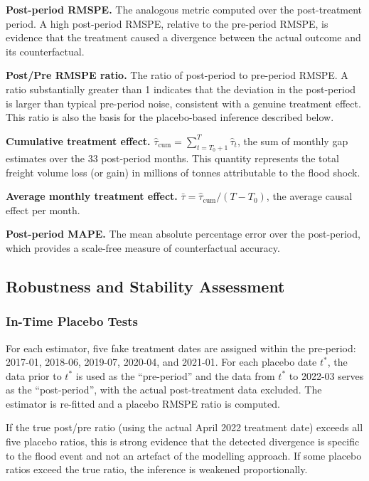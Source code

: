 \textbf{Post-period RMSPE.}
The analogous metric computed over the post-treatment period.
A high post-period RMSPE, relative to the pre-period RMSPE, is
evidence that the treatment caused a divergence between the actual
outcome and its counterfactual.

\textbf{Post/Pre RMSPE ratio.}
The ratio of post-period to pre-period RMSPE.
A ratio substantially greater than 1 indicates that the deviation
in the post-period is larger than typical pre-period noise,
consistent with a genuine treatment effect.
This ratio is also the basis for the placebo-based inference described
below.

\textbf{Cumulative treatment effect.}
$\hat{\tau}_{\text{cum}} = \sum_{t=T_0+1}^{T} \hat{\tau}_t$, the
sum of monthly gap estimates over the 33 post-period months.
This quantity represents the total freight volume loss (or gain) in
millions of tonnes attributable to the flood shock.

\textbf{Average monthly treatment effect.}
$\bar{\tau} = \hat{\tau}_{\text{cum}} / (T - T_0)$, the average
causal effect per month.

\textbf{Post-period MAPE.}
The mean absolute percentage error over the post-period, which
provides a scale-free measure of counterfactual accuracy.

\subsection{Robustness and Stability Assessment}
\label{sec:robustness}

\subsubsection{In-Time Placebo Tests}
\label{sec:placebo}

For each estimator, five fake treatment dates are assigned within
the pre-period: 2017-01, 2018-06, 2019-07, 2020-04, and 2021-01.
For each placebo date $t^*$, the data prior to $t^*$ is used as the
``pre-period'' and the data from $t^*$ to 2022-03 serves as the
``post-period'', with the actual post-treatment data excluded.
The estimator is re-fitted and a placebo RMSPE ratio is computed.

If the true post/pre ratio (using the actual April 2022 treatment
date) exceeds all five placebo ratios, this is strong evidence that
the detected divergence is specific to the flood event and not an
artefact of the modelling approach.
If some placebo ratios exceed the true ratio, the inference is
weakened proportionally.

